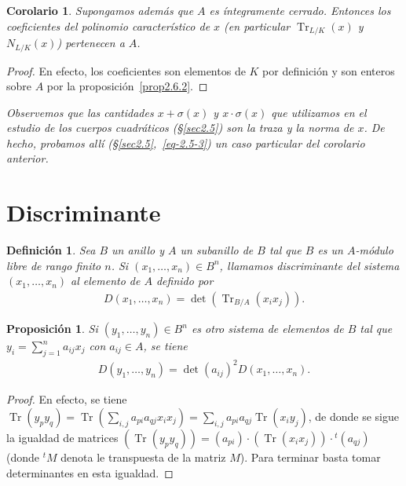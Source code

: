 \documentclass[oneside,bibtotoc,leqno,spanish]{amsbook}
\newcommand{\QED}{}%
\DeclareMathOperator{\Tr}{Tr}
\numberwithin{equation}{section}
\newenvironment{comm}%
	{\begin{trivlist}\item\small\itshape}
	{\end{trivlist}}
\theoremstyle{defi}
\newtheorem{definition}{Definici\'on}
\theoremstyle{note}
\newtheorem{proposition}{Proposici\'on}
\newtheorem*{corollary*}{Corolario}
\theoremstyle{rem}
\numberwithin{theorem}{section}
\numberwithin{proposition}{section}
\numberwithin{definition}{section}
\numberwithin{lemma}{section}
\numberwithin{corollary}{section}
\numberwithin{example}{section}
\numberwithin{footnote}{section}%
\begin{document}
\begin{corollary*}
Supongamos adem\'as que $A$ es \'integramente cerrado. Entonces los coeficientes del polinomio caracter\'istico
de $x$ (en particular $\Tr_{L/K}(x)$ y $N_{L/K}(x)$) pertenecen a $A$.
\end{corollary*}

\begin{proof}
En efecto, los coeficientes son elementos de $K$ por definici\'on y son enteros sobre $A$ por la proposici\'on~\ref{prop2.6.2}.
\end{proof}

\begin{comm}
Observemos que las cantidades $x+\sigma(x)$ y $x\cdot\sigma(x)$ que utilizamos en el estudio de los
cuerpos cuadr\'aticos (\S\ref{sec2.5}) son la traza y la norma de $x$. De hecho, probamos all\'i (\S\ref{sec2.5},~\eqref{eq-2.5-3})
un caso particular del corolario anterior.
\end{comm}

\section{Discriminante}\label{sec2.7}

\begin{definition}\label{def2.7.1}
Sea $B$ un anillo y $A$ un subanillo de $B$ tal que $B$ es un $A$-m\'odulo libre de rango finito $n$.
Si $(x_{1},\dots,x_{n})\in B^{n}$, llamamos discriminante del sistema $(x_{1},\dots,x_{n})$ al elemento
de $A$ definido por
\begin{gather}
D(x_{1},\dots,x_{n}) = \det(\Tr_{B/A}(x_{i}x_{j})).
\end{gather}
\end{definition}

\begin{proposition}\label{prop2.7.1}
Si $(y_{1},\dots,y_{n})\in B^{n}$ es otro sistema de elementos de $B$ tal que $y_{i} = \sum_{j=1}^{n}a_{ij}x_{j}$
con $a_{ij}\in A$, se tiene
\begin{gather}
D(y_{1},\dots,y_{n}) = \det(a_{ij})^{2}D(x_{1},\dots,x_{n}).
\end{gather}
\end{proposition}

\begin{proof}
En efecto, se tiene $\Tr(y_{p}y_{q}) = \Tr\left(\sum_{i,j}a_{pi}a_{qj}x_{i}x_{j}\right) = \sum_{i,j}a_{pi}a_{qj}
\Tr(x_{i}y_{j})$, de donde se sigue la igualdad de matrices
$(\Tr(y_{p}y_{q})) = (a_{pi})\cdot(\Tr(x_{i}x_{j}))\cdot{}^{t}(a_{qj})$ (donde ${}^{t}M$ denota le transpuesta de la
matriz $M$). Para terminar basta tomar determinantes en esta igualdad. \QED
\end{proof}
\end{document}

